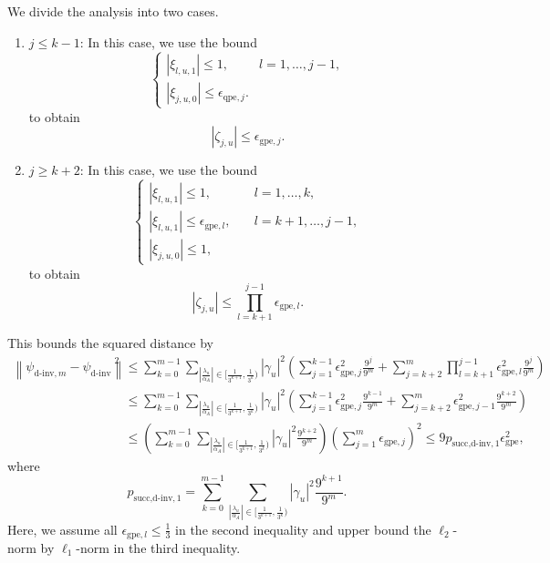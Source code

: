 \documentclass[letterpaper,onecolumn,11pt,accepted=2026-02-14]{quantumarticle}
\newcommand{\abs}[1]{\left\lvert#1\right\rvert}
\newcommand{\norm}[1]{\left\lVert#1\right\rVert}
\theoremstyle{remark}
\theoremstyle{plain}
\begin{document}
We divide the analysis into two cases.
\begin{enumerate}[label=(\roman*)]
    \item $j\leq k-1$: In this case, we use the bound 
    \begin{equation}
    \begin{cases}
        \abs{\xi_{l,u,1}}\leq1,\quad&l=1,\ldots,j-1,\\
        \abs{\xi_{j,u,0}}\leq\epsilon_{\text{qpe},j}.&
    \end{cases}
    \end{equation}
    to obtain
    \begin{equation}
        \abs{\zeta_{j,u}}\leq\epsilon_{\text{gpe},j}.
    \end{equation}
    \item $j\geq k+2$: In this case, we use the bound
    \begin{equation}
    \begin{cases}
        \abs{\xi_{l,u,1}}\leq1,\quad&l=1,\ldots,k,\\
        \abs{\xi_{l,u,1}}\leq\epsilon_{\text{gpe},l},\quad&l=k+1,\ldots,j-1,\\
        \abs{\xi_{j,u,0}}\leq1,
    \end{cases}
    \end{equation}
    to obtain
    \begin{equation}
        \abs{\zeta_{j,u}}\leq\prod_{l=k+1}^{j-1}\epsilon_{\text{gpe},l}.
    \end{equation}
\end{enumerate}
This bounds the squared distance by
\begin{equation}
\begin{aligned}
    \norm{\psi_{\text{d-inv},m}-\psi_{\text{d-inv}}}^2&\leq\sum_{k=0}^{m-1}\sum_{\abs{\frac{\lambda_u}{\alpha_A}}\in\big[\frac{1}{3^{k+1}},\frac{1}{3^k}\big)}\abs{\gamma_u}^2
    \left(\sum_{j=1}^{k-1}\epsilon_{\text{gpe},j}^2\frac{9^j}{9^m}
    +\sum_{j=k+2}^{m}\prod_{l=k+1}^{j-1}\epsilon_{\text{gpe},l}^2\frac{9^j}{9^m}\right)\\
    &\leq\sum_{k=0}^{m-1}\sum_{\abs{\frac{\lambda_u}{\alpha_A}}\in\big[\frac{1}{3^{k+1}},\frac{1}{3^k}\big)}\abs{\gamma_u}^2
    \left(\sum_{j=1}^{k-1}\epsilon_{\text{gpe},j}^2\frac{9^{k-1}}{9^m}
    +\sum_{j=k+2}^{m}\epsilon_{\text{gpe},j-1}^2\frac{9^{k+2}}{9^m}\right)\\
    &\leq\left(\sum_{k=0}^{m-1}\sum_{\abs{\frac{\lambda_u}{\alpha_A}}\in\big[\frac{1}{3^{k+1}},\frac{1}{3^k}\big)}\abs{\gamma_u}^2\frac{9^{k+2}}{9^m}\right)
    \left(\sum_{j=1}^{m}\epsilon_{\text{gpe},j}\right)^2
    \leq 9p_{\text{succ,d-inv},1}\epsilon_{\text{gpe}}^2,
\end{aligned}
\end{equation}
where
\begin{equation}
    p_{\text{succ,d-inv},1}=\sum_{k=0}^{m-1}\sum_{\abs{\frac{\lambda_u}{\alpha_A}}\in\big[\frac{1}{3^{k+1}},\frac{1}{3^k}\big)}
    \abs{\gamma_u}^2\frac{9^{k+1}}{9^m}.
\end{equation}
Here, we assume all $\epsilon_{\text{gpe},l}\leq\frac{1}{3}$ in the second inequality and upper bound the $\ell_2$-norm by $\ell_1$-norm in the third inequality.
\end{document}
